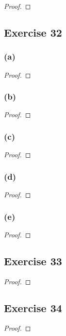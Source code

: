\documentclass[14pt]{extarticle}
\begin{document}
\begin{proof}

\end{proof}

\subsection{Exercise 32}

\subsubsection{(a)}

\begin{proof}

\end{proof}

\subsubsection{(b)}

\begin{proof}

\end{proof}

\subsubsection{(c)}

\begin{proof}

\end{proof}

\subsubsection{(d)}

\begin{proof}

\end{proof}

\subsubsection{(e)}

\begin{proof}

\end{proof}

\subsection{Exercise 33}

\begin{proof}

\end{proof}

\subsection{Exercise 34}

\begin{proof}

\end{proof}
\end{document}
